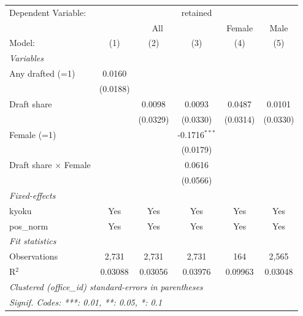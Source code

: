 \begingroup
\centering
\begin{tabular}{lccccc}
   \tabularnewline \midrule \midrule
   Dependent Variable: & \multicolumn{5}{c}{retained}\\
    & \multicolumn{3}{c}{All} & Female & Male \\ 
   Model:                       & (1)      & (2)      & (3)             & (4)      & (5)\\  
   \midrule
   \emph{Variables}\\
   Any drafted (=1)             & 0.0160   &          &                 &          &   \\   
                                & (0.0188) &          &                 &          &   \\   
   Draft share                  &          & 0.0098   & 0.0093          & 0.0487   & 0.0101\\   
                                &          & (0.0329) & (0.0330)        & (0.0314) & (0.0330)\\   
   Female (=1)                  &          &          & -0.1716$^{***}$ &          &   \\   
                                &          &          & (0.0179)        &          &   \\   
   Draft share $\times$ Female  &          &          & 0.0616          &          &   \\   
                                &          &          & (0.0566)        &          &   \\   
   \midrule
   \emph{Fixed-effects}\\
   kyoku                        & Yes      & Yes      & Yes             & Yes      & Yes\\  
   pos\_norm                    & Yes      & Yes      & Yes             & Yes      & Yes\\  
   \midrule
   \emph{Fit statistics}\\
   Observations                 & 2,731    & 2,731    & 2,731           & 164      & 2,565\\  
   R$^2$                        & 0.03088  & 0.03056  & 0.03976         & 0.09963  & 0.03048\\  
   \midrule \midrule
   \multicolumn{6}{l}{\emph{Clustered (office\_id) standard-errors in parentheses}}\\
   \multicolumn{6}{l}{\emph{Signif. Codes: ***: 0.01, **: 0.05, *: 0.1}}\\
\end{tabular}
\par\endgroup
